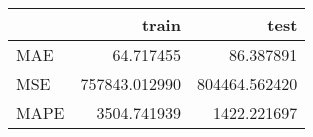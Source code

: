 \begin{tabular}{lrr}
\toprule
{} &          train &           test \\
\midrule
MAE  &      64.717455 &      86.387891 \\
MSE  &  757843.012990 &  804464.562420 \\
MAPE &    3504.741939 &    1422.221697 \\
\bottomrule
\end{tabular}
